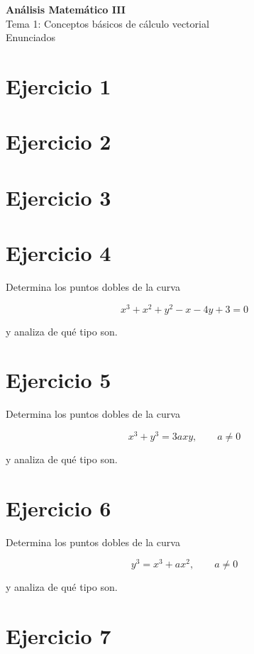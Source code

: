 \documentclass[11pt,a4paper]{article}
\begin{document}
\begin{center}
{\LARGE\bfseries Análisis Matemático III}\\[0.4em]
{\Large Tema 1: Conceptos básicos de cálculo vectorial}\\[0.4em]
{\large Enunciados}
\end{center}

\section{Ejercicio 1}


\section{Ejercicio 2}



\section{Ejercicio 3}



\section{Ejercicio 4}

Determina los puntos dobles de la curva

\[
x^3+x^2+y^2-x-4y+3=0
\]

y analiza de qué tipo son.

\section{Ejercicio 5}

Determina los puntos dobles de la curva

\[
x^3+y^3=3axy,
\qquad
a\neq0
\]

y analiza de qué tipo son.

\section{Ejercicio 6}

Determina los puntos dobles de la curva

\[
y^3=x^3+ax^2,
\qquad
a\neq0
\]

y analiza de qué tipo son.

\section{Ejercicio 7}
\end{document}
